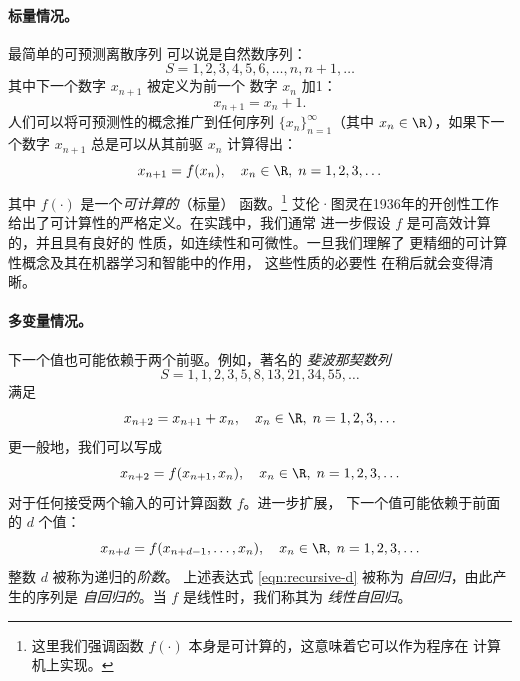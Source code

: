 \documentclass[../../book-main_zh.tex]{subfiles}
\begin{document}
\paragraph{标量情况。} 最简单的可预测离散序列
可以说是自然数序列：
\begin{equation}
    S = 1, 2, 3, 4, 5, 6, \ldots, n, n+1, \ldots
\end{equation}
其中下一个数字 \(x_{n+1}\) 被定义为前一个
数字 \(x_{n}\) 加1：
\begin{equation}
    x_{n+1} = x_{n} + 1.
\end{equation}
人们可以将可预测性的概念推广到任何序列
\(\{x_{n}\}_{n=1}^{\infty}\)（其中 \(x_{n} \in \R\)），如果下一个数字
\(x_{n+1}\) 总是可以从其前驱 \(x_{n}\) 计算得出：
\begin{equation}
    x_{n+1} = f(x_{n}), \quad x_{n} \in \R, \; n = 1, 2, 3, \ldots
\end{equation}
其中 \(f(\cdot)\) 是一个\textit{可计算的}（标量）
函数。\footnote{这里我们强调函数 \(f(\cdot)\)
    本身是可计算的，这意味着它可以作为程序在
计算机上实现。} 艾伦·图灵在1936年的开创性工作 \cite{Turing-1936}
给出了可计算性的严格定义。在实践中，我们通常
进一步假设 \(f\) 是可高效计算的，并且具有良好的
性质，如连续性和可微性。一旦我们理解了
更精细的可计算性概念及其在机器学习和智能中的作用，
这些性质的必要性
在稍后就会变得清晰。

\paragraph{多变量情况。}
下一个值也可能依赖于两个前驱。例如，著名的
\textit{斐波那契数列}
\begin{equation}
    S = 1, 1, 2, 3, 5, 8, 13, 21, 34, 55, \ldots
\end{equation}
满足
\begin{equation}
    x_{n+2} = x_{n+1} + x_{n}, \quad x_{n} \in \R, \; n = 1, 2, 3, \ldots
\end{equation}
更一般地，我们可以写成
\begin{equation}
    x_{n+2} = f(x_{n+1}, x_{n}), \quad x_{n} \in \R, \; n = 1, 2, 3, \ldots
\end{equation}
对于任何接受两个输入的可计算函数 \(f\)。进一步扩展，
下一个值可能依赖于前面的 \(d\) 个值：
\begin{equation}
    x_{n+d} = f(x_{n+d-1}, \ldots, x_{n}), \quad x_{n} \in \R, \; n =
    1, 2, 3, \ldots
    \label{eqn:recursive-d}
\end{equation}
整数 \(d\) 被称为递归的\textit{阶数}。
上述表达式 \eqref{eqn:recursive-d} 被称为
\textit{自回归}，由此产生的序列是
\textit{自回归的}。当 \(f\) 是线性时，我们称其为
\textit{线性自回归}。
\end{document}

